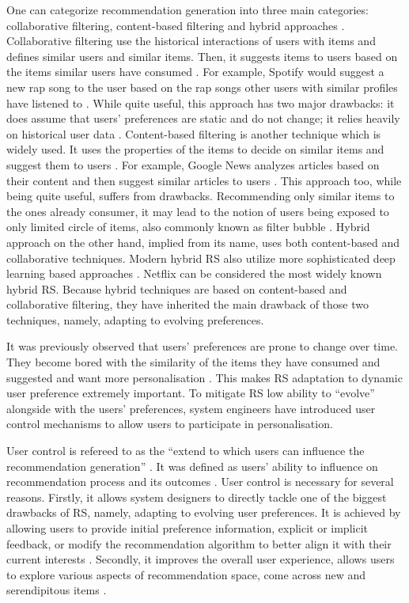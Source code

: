 \documentclass[a4paper,12pt]{article}
\begin{document}
One can categorize recommendation generation into three main categories: collaborative filtering, content-based filtering and hybrid approaches \citep{burke2002hybrid}. Collaborative filtering use the historical interactions of users with items and defines similar users and similar items. Then, it suggests items to users based on the items similar users have consumed \citep{schafer1999recommender}. For example, Spotify would suggest a new rap song to the user based on the rap songs other users with similar profiles have listened to \citep{jacobson2016music}. While quite useful, this approach has two major drawbacks: it does assume that users' preferences are static and do not change; it relies heavily on historical user data \citep{wang2011collaborative}. Content-based filtering is another technique which is widely used. It uses the properties of the items to decide on similar items and suggest them to users \citep{pazzani2007content}. For example, Google News analyzes articles based on their content and then suggest similar articles to users \citep{das2007google}. This approach too, while being quite useful, suffers from drawbacks. Recommending only similar items to the ones already consumer, it may lead to the notion of users being exposed to only limited circle of items, also commonly known as filter bubble \citep{tintarevKnowingUnknownVisualising2018}. Hybrid approach on the other hand, implied from its name, uses both content-based and collaborative techniques. Modern hybrid RS also utilize more sophisticated deep learning based approaches \citep{bahrainian2020deep}. Netflix can be considered the most widely known hybrid RS. Because hybrid techniques are based on content-based and collaborative filtering, they have inherited the main drawback of those two techniques, namely, adapting to evolving preferences. 

It was previously observed that users' preferences are prone to change over time. They become bored with the similarity of the items they have consumed and suggested and want more personalisation \citep{songWhenHowDiversify2019}. This makes RS adaptation to dynamic user preference extremely important. To mitigate RS low ability to ``evolve'' alongside with the users' preferences, system engineers have introduced user control mechanisms to allow users to participate in personalisation. 

User control is refereed to as the ``extend to which users can influence the recommendation generation'' \citep{jannach2019explanations}. It was defined as users' ability to influence on recommendation process and its outcomes \citep{knijnenburgExplainingUserExperience2012}. User control is necessary for several reasons. Firstly, it allows system designers to directly tackle one of the biggest drawbacks of RS, namely, adapting to evolving user preferences. It is achieved by allowing users to provide initial preference information, explicit or implicit feedback, or modify the recommendation algorithm to better align it with their current interests \citep{tintarev2015explaining}. Secondly, it improves the overall user experience, allows users to explore various aspects of recommendation space, come across new and serendipitous items \citep{tintarev2015explaining,kotkovSurveySerendipityRecommender2016}. 
\end{document}
